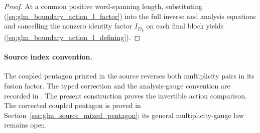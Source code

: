 \begin{proof}
    \leanok
    At a common positive word-spanning length, substituting
    (\ref{eq:glm_boundary_action_l_factor}) into the full inverse and analysis
    equations and cancelling the nonzero identity factor $I_{D_y}$ on each
    final block yields (\ref{eq:glm_boundary_action_l_defining}).
\end{proof}

\paragraph{Source index convention.}
The coupled pentagon printed in the source reverses both multiplicity pairs
in its fusion factor. The typed correction and the analysis-gauge convention
are recorded in \cite{gap:glm23_multiplicity_l_indices}. The present construction
proves the invertible action comparison. The corrected coupled pentagon is
proved in Section~\ref{sec:glm_source_mixed_pentagon}; its general
multiplicity-gauge law remains open.
